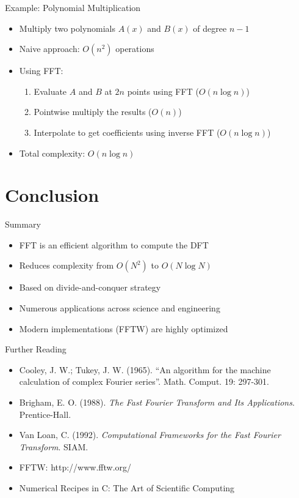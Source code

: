 \documentclass{beamer}
\begin{document}
\begin{frame}{Example: Polynomial Multiplication}
  \begin{itemize}
  \item Multiply two polynomials $A(x)$ and $B(x)$ of degree $n-1$
  \item Naive approach: $O(n^2)$ operations
  \item Using FFT:
    \begin{enumerate}
    \item Evaluate $A$ and $B$ at $2n$ points using FFT ($O(n \log n)$)
    \item Pointwise multiply the results ($O(n)$)
    \item Interpolate to get coefficients using inverse FFT ($O(n \log n)$)
    \end{enumerate}
  \item Total complexity: $O(n \log n)$
  \end{itemize}
\end{frame}

\section{Conclusion}

\begin{frame}{Summary}
  \begin{itemize}
  \item FFT is an efficient algorithm to compute the DFT
  \item Reduces complexity from $O(N^2)$ to $O(N \log N)$
  \item Based on divide-and-conquer strategy
  \item Numerous applications across science and engineering
  \item Modern implementations (FFTW) are highly optimized
  \end{itemize}
\end{frame}

\begin{frame}{Further Reading}
  \begin{itemize}
  \item Cooley, J. W.; Tukey, J. W. (1965). ``An algorithm for the machine calculation of complex Fourier series''. Math. Comput. 19: 297-301.
  \item Brigham, E. O. (1988). \textit{The Fast Fourier Transform and Its Applications}. Prentice-Hall.
  \item Van Loan, C. (1992). \textit{Computational Frameworks for the Fast Fourier Transform}. SIAM.
  \item FFTW: http://www.fftw.org/
  \item Numerical Recipes in C: The Art of Scientific Computing
  \end{itemize}
\end{frame}
\end{document}
